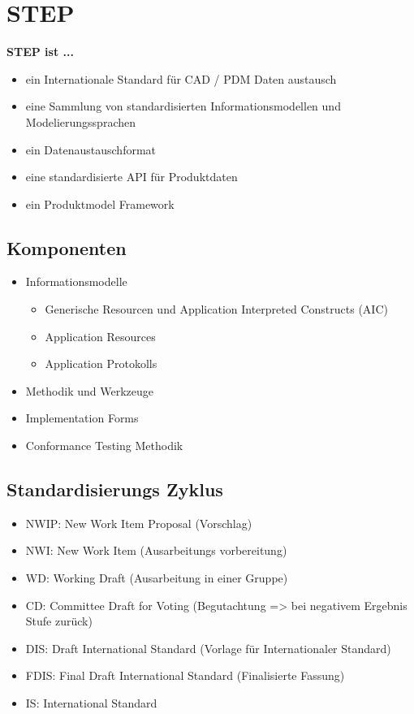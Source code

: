 \chapter{STEP}

\textbf{STEP ist ...}

\begin{itemize}
\item ein Internationale Standard für CAD / PDM Daten austausch
\item eine Sammlung von standardisierten Informationsmodellen und Modelierungssprachen
\item ein Datenaustauschformat
\item eine standardisierte API für Produktdaten
\item ein Produktmodel Framework
\end{itemize}

\section{Komponenten}

\begin{itemize}
\item {
Informationsmodelle
\begin{itemize}
\item Generische Resourcen und Application Interpreted Constructs (AIC)
\item Application Resources
\item Application Protokolls
\end{itemize}
}
\item Methodik und Werkzeuge
\item Implementation Forms
\item Conformance Testing Methodik
\end{itemize}

\section{Standardisierungs Zyklus}

\begin{itemize}
\item NWIP: New Work Item Proposal (Vorschlag)
\item NWI: New Work Item (Ausarbeitungs vorbereitung)
\item WD: Working Draft (Ausarbeitung in einer Gruppe)
\item CD: Committee Draft for Voting (Begutachtung => bei negativem Ergebnis Stufe zurück) 
\item DIS: Draft International Standard (Vorlage für Internationaler Standard)
\item FDIS: Final Draft International Standard (Finalisierte Fassung)
\item IS: International Standard
\end{itemize}

